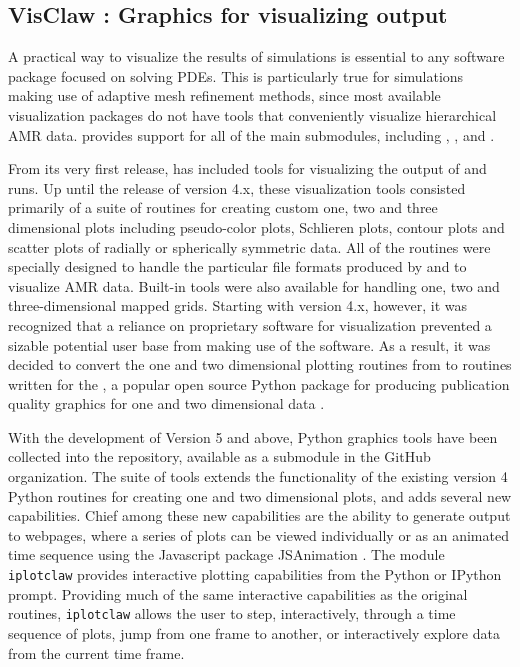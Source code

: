 %
%
%

\subsection{VisClaw : Graphics for visualizing \clawpack output}
A practical way to visualize the results of simulations is
essential to any software package focused on solving PDEs.
This is particularly true for simulations making use of adaptive mesh
refinement methods, since most available visualization packages do not
have tools that conveniently visualize hierarchical AMR data.  \visclaw provides 
support for all of the main \clawpack submodules, including
\classic, \amrclaw, \pyclaw and \geoclaw.

From its very first release,
\clawpack has included tools for visualizing the output of \clawpack and
\amrclaw runs.  Up until the release of version \clawpack 4.x, these
visualization tools consisted primarily of a suite of \mlab routines
for creating custom one, two and three dimensional plots including
pseudo-color plots, Schlieren plots, contour plots and scatter plots
of radially or spherically symmetric data. All of the routines were
specially designed to handle the particular file formats produced by
\clawpack and to visualize AMR data.  Built-in tools were also available
for handling one, two and three-dimensional mapped grids.
Starting with version 4.x, however, it was recognized that a reliance
on proprietary software for visualization prevented a sizable
potential user base from making use of the \clawpack software.  As a
result, it was decided to convert the one and two dimensional plotting
routines from \mlab to routines written for the \mplotlib,
a popular open source
Python package for producing publication quality graphics
for one and two dimensional data \cite{Hunter:2007}.

With the development of \clawpack Version 5 and above, Python graphics tools
have been collected into the  repository, available as a
submodule in the
\clawpack GitHub organization.  The \visclaw suite of tools extends the
functionality of the existing version 4 Python routines for creating one and
two dimensional plots, and adds several new capabilities.  Chief among
these new capabilities are the ability to generate output to webpages,
where a series of plots can be viewed individually or as an animated
time sequence using the Javascript package {\sc JSAnimation}
\cite{jsanimation}.
The \visclaw module {\tt iplotclaw} provides
interactive plotting capabilities from the Python or IPython prompt.
Providing much of the same interactive capabilities as the original
\mlab routines, {\tt iplotclaw} allows the user to step,
interactively, through a time sequence of plots, jump from one frame
to another, or interactively explore data from the current time frame.

